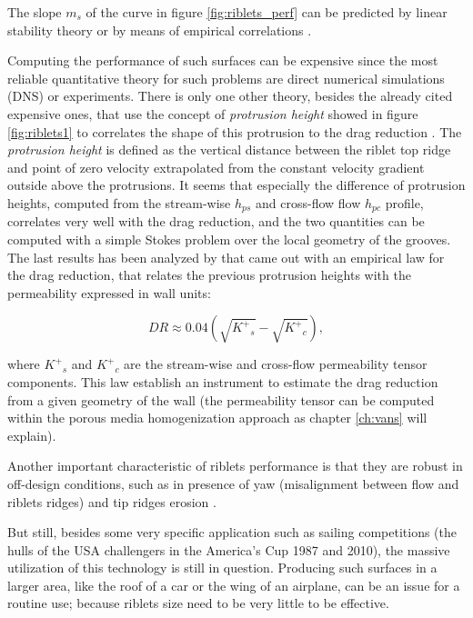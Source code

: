 The slope $m_s$ of the curve in figure \ref{fig:riblets_perf} can be predicted by linear stability theory or by means of empirical correlations \citet{garcia2011hydrodynamic}.

Computing the performance of such surfaces can be expensive since the most reliable quantitative theory for such problems are direct numerical simulations (DNS) or experiments.
There is only one other theory, besides the already cited expensive ones, that use the concept of \textit{protrusion height} showed in figure \ref{fig:riblets1} to correlates the shape of this protrusion to the drag reduction \citet{luchini1991resistance}.
The \textit{protrusion height} is defined as the vertical distance between the riblet top ridge and point of zero velocity extrapolated from the constant velocity gradient outside above the protrusions.
It seems that especially the difference of protrusion heights, computed from the stream-wise $h_{ps}$ and cross-flow flow $h_{pc}$ profile, correlates very well with the drag reduction, and the two quantities can be computed with a simple Stokes problem over the local geometry of the grooves.
The last results has been analyzed by \citet{segura2017permeable} that came out with an empirical law for the drag reduction, that relates the previous protrusion heights with the permeability expressed in wall units:

\begin{equation}
DR \approx 0.04\left( \sqrt{{K^+}_s} - \sqrt{{K^+}_c} \right),
\label{eq:max_dr}
\end{equation}

where ${K^+}_s$ and ${K^+}_c$ are the stream-wise and cross-flow permeability tensor components.
This law establish an instrument to estimate the drag reduction from a given geometry of the wall (the permeability tensor can be computed within the porous media homogenization approach as chapter \ref{ch:vans} will explain).

Another important characteristic of riblets performance is that they are robust in off-design conditions, such as in presence of yaw (misalignment between flow and riblets ridges) and tip ridges erosion \citet{garcia2011drag}.

But still, besides some very specific application such as sailing competitions (the hulls of the USA challengers in the America’s Cup 1987 and 2010), the massive utilization of this technology is still in question.
Producing such surfaces in a larger area, like the roof of a car or the wing of an airplane, can be an issue for a routine use; because riblets size need to be very little to be effective.

